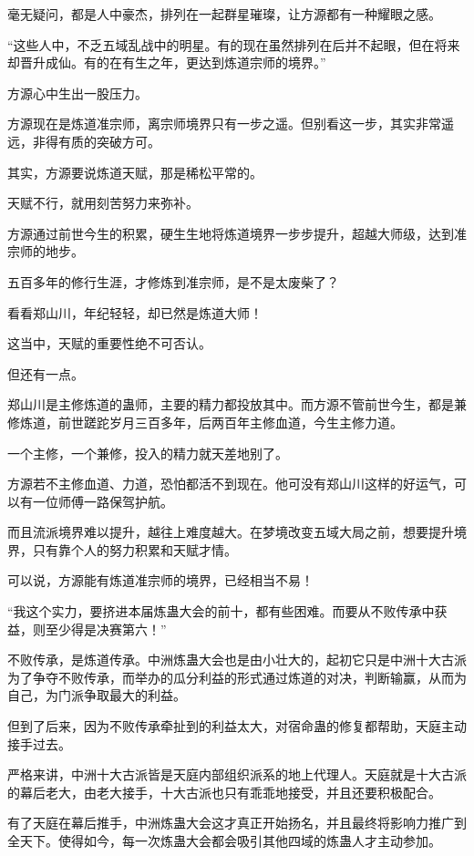 \begin{this_body}
毫无疑问，都是人中豪杰，排列在一起群星璀璨，让方源都有一种耀眼之感。

“这些人中，不乏五域乱战中的明星。有的现在虽然排列在后并不起眼，但在将来却晋升成仙。有的在有生之年，更达到炼道宗师的境界。”

方源心中生出一股压力。

方源现在是炼道准宗师，离宗师境界只有一步之遥。但别看这一步，其实非常遥远，非得有质的突破方可。

其实，方源要说炼道天赋，那是稀松平常的。

天赋不行，就用刻苦努力来弥补。

方源通过前世今生的积累，硬生生地将炼道境界一步步提升，超越大师级，达到准宗师的地步。

五百多年的修行生涯，才修炼到准宗师，是不是太废柴了？

看看郑山川，年纪轻轻，却已然是炼道大师！

这当中，天赋的重要性绝不可否认。

但还有一点。

郑山川是主修炼道的蛊师，主要的精力都投放其中。而方源不管前世今生，都是兼修炼道，前世蹉跎岁月三百多年，后两百年主修血道，今生主修力道。

一个主修，一个兼修，投入的精力就天差地别了。

方源若不主修血道、力道，恐怕都活不到现在。他可没有郑山川这样的好运气，可以有一位师傅一路保驾护航。

而且流派境界难以提升，越往上难度越大。在梦境改变五域大局之前，想要提升境界，只有靠个人的努力积累和天赋才情。

可以说，方源能有炼道准宗师的境界，已经相当不易！

“我这个实力，要挤进本届炼蛊大会的前十，都有些困难。而要从不败传承中获益，则至少得是决赛第六！”

不败传承，是炼道传承。中洲炼蛊大会也是由小壮大的，起初它只是中洲十大古派为了争夺不败传承，而举办的瓜分利益的形式通过炼道的对决，判断输赢，从而为自己，为门派争取最大的利益。

但到了后来，因为不败传承牵扯到的利益太大，对宿命蛊的修复都帮助，天庭主动接手过去。

严格来讲，中洲十大古派皆是天庭内部组织派系的地上代理人。天庭就是十大古派的幕后老大，由老大接手，十大古派也只有乖乖地接受，并且还要积极配合。

有了天庭在幕后推手，中洲炼蛊大会这才真正开始扬名，并且最终将影响力推广到全天下。使得如今，每一次炼蛊大会都会吸引其他四域的炼蛊人才主动参加。


\end{this_body}
